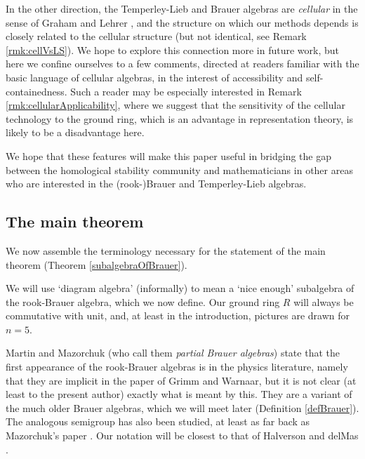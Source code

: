 \documentclass[12pt]{amsart}
\theoremstyle{plain}
\theoremstyle{definition} \newtheorem{definition}[theorem]{Definition}
\theoremstyle{plain}
\theoremstyle{plain} \newtheorem{proposition}[theorem]{Proposition}
\theoremstyle{plain} \newtheorem{conjecture}[theorem]{Conjecture}
\theoremstyle{plain} \newtheorem{corollary}[theorem]{Corollary}
\theoremstyle{remark} \newtheorem{claim}[theorem]{Claim}
\theoremstyle{remark} \newtheorem{remark}[theorem]{Remark}
\theoremstyle{remark} \newtheorem{example}[theorem]{Example}
\theoremstyle{remark} \newtheorem{comment}[theorem]{Comment}
\theoremstyle{definition} \newtheorem{question}[theorem]{Question}
\begin{document}
In the other direction, the Temperley-Lieb and Brauer algebras are \emph{cellular} in the sense of Graham and Lehrer \cite{GrahamLehrer}, and the structure on which our methods depends is closely related to the cellular structure (but not identical, see Remark \ref{rmk:cellVsLS}). We hope to explore this connection more in future work, but here we confine ourselves to a few comments, directed at readers familiar with the basic language of cellular algebras, in the interest of accessibility and self-containedness. Such a reader may be especially interested in Remark \ref{rmk:cellularApplicability}, where we suggest that the sensitivity of the cellular technology to the ground ring, which is an advantage in representation theory, is likely to be a disadvantage here.

We hope that these features will make this paper useful in bridging the gap between the homological stability community and mathematicians in other areas who are interested in the (rook-)Brauer and Temperley-Lieb algebras.

\subsection{The main theorem}

We now assemble the terminology necessary for the statement of the main theorem (Theorem \ref{subalgebraOfBrauer}).

We will use `diagram algebra' (informally) to mean a `nice enough' subalgebra of the rook-Brauer algebra, which we now define. Our ground ring $R$ will always be commutative with unit, and, at least in the introduction, pictures are drawn for $n=5$.

Martin and Mazorchuk \cite{MartinMazorchuk} (who call them \emph{partial Brauer algebras}) state that the first appearance of the rook-Brauer algebras is in the physics literature, namely that they are implicit in the paper \cite{GrimmWarnaar} of Grimm and Warnaar, but it is not clear (at least to the present author) exactly what is meant by this. They are a variant of the much older Brauer algebras, which we will meet later (Definition \ref{defBrauer}). The analogous semigroup has also been studied, at least as far back as Mazorchuk's paper \cite{MazorchukPre}. Our notation will be closest to that of Halverson and delMas \cite{HalversondelMas}.
\end{document}

